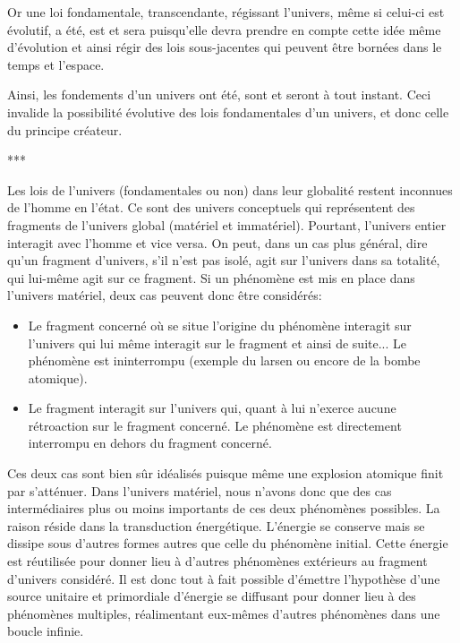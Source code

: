 Or une loi fondamentale, transcendante, régissant l'univers, même si celui-ci est évolutif, a été, est et sera puisqu’elle devra prendre en compte cette idée même d’évolution et ainsi régir des lois sous-jacentes qui peuvent être bornées dans le temps et l’espace.

Ainsi, les fondements d’un univers ont été, sont et seront à tout instant. Ceci invalide la possibilité évolutive des lois fondamentales d'un univers, et donc celle du principe créateur.

\begin{center}
***
\end{center}

Les lois de l'univers (fondamentales ou non) dans leur globalité restent inconnues de l'homme en l'état. Ce sont des univers conceptuels qui représentent des fragments de l'univers global (matériel et immatériel). Pourtant, l'univers entier interagit avec l'homme et vice versa. On peut, dans un cas plus général, dire qu’un fragment d'univers, s'il n'est pas isolé, agit sur l'univers dans sa totalité, qui lui-même agit sur ce fragment. Si un phénomène est mis en place dans l'univers matériel, deux cas peuvent donc être considérés:

\begin{itemize}
\item Le fragment concerné où se situe l’origine du phénomène interagit sur l’univers qui lui même interagit sur le fragment et ainsi de suite... Le phénomène est ininterrompu (exemple du larsen ou encore de la bombe atomique).
\item Le fragment interagit sur l’univers qui, quant à lui n’exerce aucune rétroaction sur le fragment concerné. Le phénomène est directement interrompu en dehors du fragment concerné.
\end{itemize}

Ces deux cas sont bien sûr idéalisés puisque même une explosion atomique finit par s’atténuer. Dans l'univers matériel, nous n'avons donc que des cas intermédiaires plus ou moins importants de ces deux phénomènes possibles. La raison réside dans la transduction énergétique. L’énergie se conserve mais se dissipe sous d’autres formes autres que celle du phénomène initial. Cette énergie est réutilisée pour donner lieu à d’autres phénomènes extérieurs au fragment d'univers considéré. Il est donc tout à fait possible d’émettre l’hypothèse d’une source unitaire et primordiale d’énergie se diffusant pour donner lieu à des phénomènes multiples, réalimentant eux-mêmes d’autres phénomènes dans une boucle infinie.

